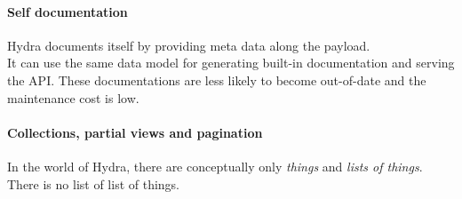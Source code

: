 \paragraph{Self documentation}
Hydra documents itself by providing meta data along the payload. \\
It can use the same data model for generating built-in documentation and serving the API. These documentations are less likely to become out-of-date and the maintenance cost is low.

\paragraph{Collections, partial views and pagination}
In the world of Hydra, there are conceptually only \textit{things} and \textit{lists of things}. There is no list of list of things. \\

